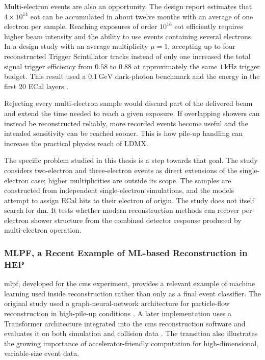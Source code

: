 Multi-electron events are also an opportunity. The design report estimates
that \(4\times10^{14}\) \gls{eot} can be accumulated in about twelve months
with an average of one electron per sample. Reaching exposures of order
\(10^{16}\) \gls{eot} efficiently requires higher beam intensity and the
ability to use events containing several electrons. In a design study with
an average multiplicity \(\mu=1\), accepting up to four reconstructed
Trigger Scintillator tracks instead of only one increased the total signal
trigger efficiency from \(0.58\) to \(0.88\) at approximately the same
\(1\,\mathrm{kHz}\) trigger budget. This result used a
\(0.1\,\mathrm{GeV}\) dark-photon benchmark and the energy in the first 20
ECal layers \cite{ldmx2025-overview}.


Rejecting every multi-electron sample would discard part of the delivered
beam and extend the time needed to reach a given exposure. If overlapping
showers can instead be reconstructed reliably, more recorded events become
useful and the intended sensitivity can be reached sooner. This is how
pile-up handling can increase the practical physics reach of LDMX.

The specific problem studied in this thesis is a step towards that goal. The
study considers two-electron and three-electron events as direct extensions
of the single-electron case; higher multiplicities are outside its scope. The
samples are constructed from independent single-electron simulations, and
the models attempt to assign ECal hits to their electron of origin. The study
does not itself search for \gls{dm}. It tests whether modern reconstruction
methods can recover per-electron shower structure from the combined detector
response produced by multi-electron operation.

\subsubsection{MLPF, a Recent Example of ML-based Reconstruction in HEP}

\Gls{mlpf}, developed for the \gls{cms} experiment, provides a relevant
example of machine learning used inside reconstruction rather than only as a
final event classifier. The original study used a graph-neural-network
architecture for particle-flow reconstruction in high-pile-up conditions
\cite{pata2021-mlpf}. A later implementation uses a Transformer architecture
integrated into the \gls{cms} reconstruction software and evaluates it on both
simulation and collision data \cite{pata2026-mlpf}. The transition also
illustrates the growing importance of accelerator-friendly computation for
high-dimensional, variable-size event data.

